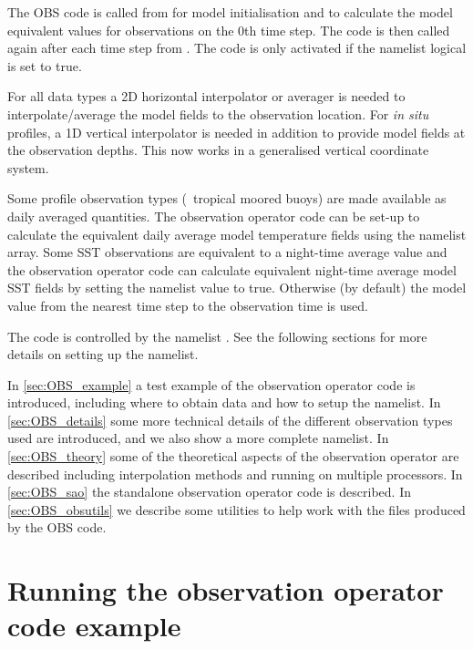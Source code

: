 \documentclass[../main/NEMO_manual]{subfiles}
\begin{document}
The OBS code is called from  for model initialisation and to calculate the model equivalent values for observations on the 0th time step.
The code is then called again after each time step from .
The code is only activated if the  namelist logical  is set to true.

For all data types a 2D horizontal interpolator or averager is needed to
interpolate/average the model fields to the observation location.
For {\em in situ} profiles, a 1D vertical interpolator is needed in addition to
provide model fields at the observation depths.
This now works in a generalised vertical coordinate system.

Some profile observation types (\eg\ tropical moored buoys) are made available as daily averaged quantities.
The observation operator code can be set-up to calculate the equivalent daily average model temperature fields using
the  namelist array.
Some SST observations are equivalent to a night-time average value and
the observation operator code can calculate equivalent night-time average model SST fields by
setting the namelist value  to true.
Otherwise (by default) the model value from the nearest time step to the observation time is used.

The code is controlled by the namelist .
See the following sections for more details on setting up the namelist.

In \autoref{sec:OBS_example} a test example of the observation operator code is introduced, including
where to obtain data and how to setup the namelist.
In \autoref{sec:OBS_details} some more technical details of the different observation types used are introduced, and we
also show a more complete namelist.
In \autoref{sec:OBS_theory} some of the theoretical aspects of the observation operator are described including
interpolation methods and running on multiple processors.
In \autoref{sec:OBS_sao} the standalone observation operator code is described.
In \autoref{sec:OBS_obsutils} we describe some utilities to help work with the files produced by the OBS code.

\section{Running the observation operator code example}
\label{sec:OBS_example}
\end{document}
